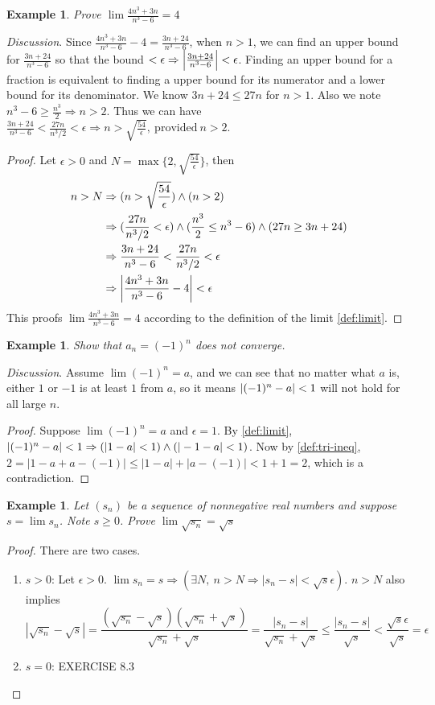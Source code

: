 \documentclass[12pt, lettersize]{book}
\newtheorem{eg}[thm]{Example}
\begin{document}
		\begin{eg}
			Prove $\lim\frac{4n^3+3n}{n^3-6}=4$
		\end{eg}
		\emph{Discussion}. Since $\frac{4n^3+3n}{n^3-6}-4 = \frac{3n+24}{n^3-6}$, when $n>1$, we can find an upper bound for
		$\frac{3n+24}{n^3-6}$ so that the bound $<\epsilon \Rightarrow \abs{\frac{3n+24}{n^3-6}}<\epsilon$. Finding an upper bound for a fraction is equivalent to finding a upper bound for its numerator and a lower bound for its denominator.
		We know $3n+24\leq27n$ for $n>1$. Also we note $n^3-6\geq\frac{n^3}{2} \Rightarrow n>2$. Thus we can have $\frac{3n+24}{n^3-6}<\frac{27n}{n^3/2}<\epsilon \Rightarrow n>\sqrt{\frac{54}{\epsilon}},\ \text{provided}\ n>2$.
		\begin{proof}
			Let $\epsilon>0$ and $N=\max\{2,\sqrt{\frac{54}{\epsilon}}\}$, then
		\begin{align*}
			n>N &\Rightarrow (n>\sqrt{\frac{54}{\epsilon}})\land(n>2)\\
			&\Rightarrow (\frac{27n}{n^3/2}<\epsilon)\land(\frac{n^3}{2}\leq n^3-6)\land(27n\geq3n+24)\\
			&\Rightarrow \frac{3n+24}{n^3-6} < \frac{27n}{n^3/2} < \epsilon\\
			&\Rightarrow \abs{\frac{4n^3+3n}{n^3-6}-4} < \epsilon
		\end{align*}
		This proofs $\lim\frac{4n^3+3n}{n^3-6}=4$ according to the definition of the limit \ref{def:limit}.
		\end{proof}
		
		\begin{eg}
		Show that $a_n=(-1)^n$ does not converge.
		\end{eg}
		\emph{Discussion}. Assume $\lim(-1)^n=a$, and we can see that no matter what $a$ is, either $1$ or $-1$ is at least
		$1$ from $a$, so it means $\abs{(-1)^n-a}<1$ will not hold for all large $n$.
		\begin{proof}
		Suppose $\lim(-1)^n=a$ and $\epsilon = 1$. By \ref{def:limit}, $\abs{(-1)^n-a}<1 \Rightarrow (|1-a|<1)\land(|-1-a|<1)$.
		Now by \ref{def:tri-ineq}, $2=|1-a+a-(-1)|\leq|1-a|+|a-(-1)|<1+1=2$, which is a contradiction. 
		\end{proof}
		
		\begin{eg}
		Let $(s_n)$ be a sequence of nonnegative real numbers and suppose $s=\lim s_n$. Note $s\geq0$. Prove $\lim\sqrt{s_n}=\sqrt{s}$
		\end{eg}
		\begin{proof}
		There are two cases.
		\begin{enumerate}
			\item $s>0$: Let $\epsilon>0$. $\lim s_n=s \Rightarrow (\exists N,\ n>N \Rightarrow |s_n-s|<\sqrt{s}\epsilon)$.
			$n>N$ also implies
			\begin{displaymath}
				|\sqrt{s_n}-\sqrt{s}|=\frac{(\sqrt{s_n}-\sqrt{s})(\sqrt{s_n}+\sqrt{s})}{\sqrt{s_n}+\sqrt{s}}=\frac{|s_n-s|}{\sqrt{s_n}+\sqrt{s}}\leq\frac{|s_n-s|}{\sqrt{s}}<\frac{\sqrt{s}\epsilon}{\sqrt{s}}=\epsilon
			\end{displaymath}
			\item $s=0$: EXERCISE 8.3 
		\end{enumerate}
		\end{proof}
	
\end{document}
